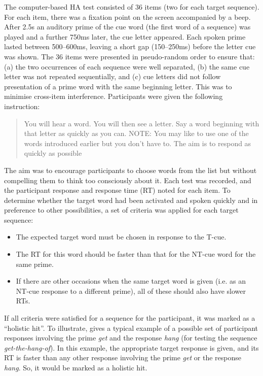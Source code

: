 \documentclass[output=paper]{langscibook}
\begin{document}
The computer-based HA test consisted of 36 items (two for each target sequence). For each item, there was a fixation point on the screen accompanied by a beep. After 2.5s an auditory prime of the cue word (the first word of a sequence) was played and a further 750ms later, the cue letter appeared. Each spoken prime lasted between 500--600ms, leaving a short gap (150--250ms) before the letter cue was shown. The 36 items were presented in pseudo-random order to ensure that: (a) the two occurrences of each sequence were well separated, (b) the same cue letter was not repeated sequentially, and (c) cue letters did not follow presentation of a prime word with the same beginning letter. This was to minimise cross-item interference. Participants were given the following instruction: 

\begin{quote}
You will hear a word. You will then see a letter. Say a word beginning with that letter as quickly as you can. NOTE: You may like to use one of the words introduced earlier but you don’t have to. The aim is to respond as quickly as possible
\end{quote}

The aim was to encourage participants to choose words from the list but without compelling them to think too consciously about it. Each test was recorded, and the participant response and response time (RT) noted for each item. To determine whether the target word had been activated and spoken quickly and in preference to other possibilities, a set of criteria was applied for each target sequence:

\begin{itemize}
\item The expected target word must be chosen in response to the T-cue.
\item The RT for this word should be faster than that for the NT-cue word for the same prime.
\item If there are other occasions when the same target word is given (i.e. as an NT-cue response to a different prime), all of these should also have slower RTs.
\end{itemize}

If all criteria were satisfied for a sequence for the participant, it was marked as a ``holistic hit''. To illustrate,  gives a typical example of a possible set of participant responses involving the prime \textit{get} and the response \textit{hang} (for testing the sequence \textit{get-the-hang-of}). In this example, the appropriate target response is given, and its RT is faster than any other response involving the prime \textit{get} or the response \textit{hang}. So, it would be marked as a holistic hit.
\end{document}

